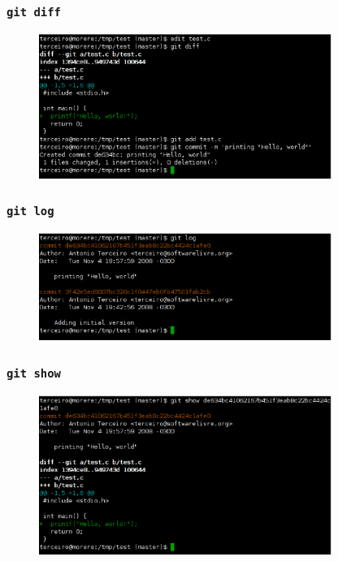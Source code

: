 \documentclass{beamer}
\begin{document}
\begin{frame}
  \frametitle{\texttt{git diff}}
  \begin{figure}[h]
    \begin{center}
      \includegraphics[width=0.85\textwidth]{figs/git-screenshot-diff.eps}
    \end{center}
    \label{fig:git-diff}
  \end{figure}
\end{frame}

\begin{frame}
  \frametitle{\texttt{git log}}
  \begin{figure}[h]
    \begin{center}
      \includegraphics[width=0.85\textwidth]{figs/git-screenshot-log.eps}
    \end{center}
    \label{fig:git-log}
  \end{figure}
\end{frame}

\begin{frame}
  \frametitle{\texttt{git show}}
  \begin{figure}[h]
    \begin{center}
      \includegraphics[width=0.85\textwidth]{figs/git-screenshot-show.eps}
    \end{center}
    \label{fig:git-show}
  \end{figure}
\end{frame}
\end{document}
